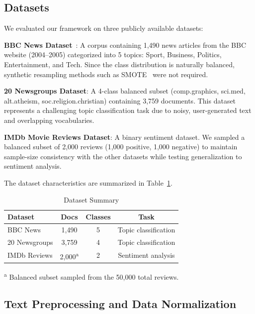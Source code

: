\documentclass[conference]{IEEEtran}
\begin{document}
\subsection{Datasets}

We evaluated our framework on three publicly available datasets:

\textbf{BBC News Dataset}~\cite{ref17}: A corpus containing 1,490 news articles from the BBC website (2004--2005) categorized into 5 topics: Sport, Business, Politics, Entertainment, and Tech. Since the class distribution is naturally balanced, synthetic resampling methods such as SMOTE~\cite{ref4} were not required.

\textbf{20 Newsgroups Dataset}: A 4-class balanced subset (comp.graphics, sci.med, alt.atheism, soc.religion.christian) containing 3,759 documents. This dataset represents a challenging topic classification task due to noisy, user-generated text and overlapping vocabularies.

\textbf{IMDb Movie Reviews Dataset}: A binary sentiment dataset. We sampled a balanced subset of 2,000 reviews (1,000 positive, 1,000 negative) to maintain sample-size consistency with the other datasets while testing generalization to sentiment analysis.

The dataset characteristics are summarized in Table~\ref{tab:dataset}.

\begin{table}[htbp]
\caption{Dataset Summary}
\label{tab:dataset}
\centering
\small
\begin{tabular}{lccc}
\toprule
\textbf{Dataset} & \textbf{Docs} & \textbf{Classes} & \textbf{Task} \\
\midrule
BBC News       & 1,490  & 5  & Topic classification \\
20 Newsgroups  & 3,759  & 4  & Topic classification \\
IMDb Reviews   & 2,000\textsuperscript{a}  & 2  & Sentiment analysis \\
\bottomrule
\end{tabular}
\begin{flushleft}
\scriptsize \textsuperscript{a} Balanced subset sampled from the 50,000 total reviews.
\end{flushleft}
\end{table}

\subsection{Text Preprocessing and Data Normalization}
\end{document}
